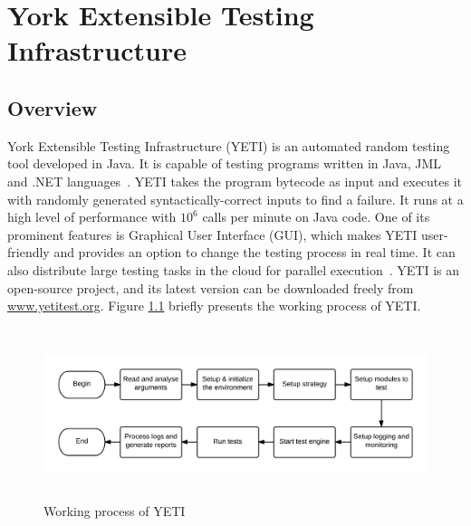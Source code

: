 
\chapter{York Extensible Testing Infrastructure}
\label{chap:yeti_3}





\section{Overview}
York Extensible Testing Infrastructure (YETI) is an automated random testing tool developed in Java. It is capable of testing programs written in Java, JML and .NET languages~\cite{oriol2010testing}. YETI takes the program bytecode as input and executes it with randomly generated syntactically-correct inputs to find a failure. It runs at a high level of performance with $10^6$ calls per minute on Java code. One of its prominent features is Graphical User Interface (GUI), which makes YETI user-friendly and provides an option to change the testing process in real time. It can also distribute large testing tasks in the cloud for parallel execution~\cite{oriol2010yeti}. YETI is an open-source project, and its latest version can be downloaded freely from \url{www.yetitest.org}. Figure \ref{fig:yetiOverview} briefly presents the working process of YETI. 
\bigskip
\begin{figure}[h]
	\centering
	\includegraphics[width=15.3cm, height=5cm]{chapter3/workingProcess.png}
	\bigskip
	\caption{Working process of YETI}
	\label{fig:yetiOverview}
\end{figure}


